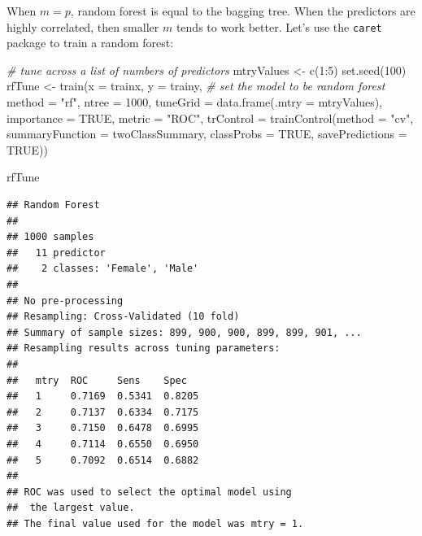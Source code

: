 \documentclass[
  12pt,
]{krantz}
\makeatletter
\newenvironment{Shaded}{\begin{snugshade}}{\end{snugshade}}
\newcommand{\AttributeTok}[1]{\textcolor[rgb]{0.61,0.61,0.61}{#1}}
\newcommand{\CommentTok}[1]{\textcolor[rgb]{0.37,0.37,0.37}{\textit{#1}}}
\newcommand{\ConstantTok}[1]{\textcolor[rgb]{0,0,0}{#1}}
\newcommand{\DecValTok}[1]{\textcolor[rgb]{0.06,0.06,0.06}{#1}}
\newcommand{\FunctionTok}[1]{\textcolor[rgb]{0,0,0}{#1}}
\newcommand{\NormalTok}[1]{#1}
\newcommand{\OtherTok}[1]{\textcolor[rgb]{0.37,0.37,0.37}{#1}}
\newcommand{\SpecialCharTok}[1]{\textcolor[rgb]{0,0,0}{#1}}
\newcommand{\StringTok}[1]{\textcolor[rgb]{0.5,0.5,0.5}{#1}}
\newenvironment{kframe}{%
\medskip{}
\setlength{\fboxsep}{.8em}
 \def\at@end@of@kframe{}%
 \ifinner\ifhmode%
  \def\at@end@of@kframe{\end{minipage}}%
  \begin{minipage}{\columnwidth}%
 \fi\fi%
 \def\FrameCommand##1{\hskip\@totalleftmargin \hskip-\fboxsep
 \colorbox{shadecolor}{##1}\hskip-\fboxsep
     \hskip-\linewidth \hskip-\@totalleftmargin \hskip\columnwidth}%
 \MakeFramed {\advance\hsize-\width
   \@totalleftmargin\z@ \linewidth\hsize
   \@setminipage}}%
 {\par\unskip\endMakeFramed%
 \at@end@of@kframe}
\renewenvironment{Shaded}{\begin{kframe}}{\end{kframe}}
\makeatother
\begin{document}
When \(m=p\), random forest is equal to the bagging tree. When the predictors are highly correlated, then smaller \(m\) tends to work better. Let's use the \texttt{caret} package to train a random forest:

\begin{Shaded}
\begin{Highlighting}[]
\CommentTok{\# tune across a list of numbers of predictors}
\NormalTok{mtryValues }\OtherTok{\textless{}{-}} \FunctionTok{c}\NormalTok{(}\DecValTok{1}\SpecialCharTok{:}\DecValTok{5}\NormalTok{)}
\FunctionTok{set.seed}\NormalTok{(}\DecValTok{100}\NormalTok{)}
\NormalTok{rfTune }\OtherTok{\textless{}{-}} \FunctionTok{train}\NormalTok{(}\AttributeTok{x =}\NormalTok{ trainx, }
               \AttributeTok{y =}\NormalTok{ trainy,}
               \CommentTok{\# set the model to be random forest}
               \AttributeTok{method =} \StringTok{"rf"}\NormalTok{,}
               \AttributeTok{ntree =} \DecValTok{1000}\NormalTok{,}
               \AttributeTok{tuneGrid =} \FunctionTok{data.frame}\NormalTok{(}\AttributeTok{.mtry =}\NormalTok{ mtryValues),}
               \AttributeTok{importance =} \ConstantTok{TRUE}\NormalTok{,}
               \AttributeTok{metric =} \StringTok{"ROC"}\NormalTok{,}
               \AttributeTok{trControl =} \FunctionTok{trainControl}\NormalTok{(}\AttributeTok{method =} \StringTok{"cv"}\NormalTok{,}
                           \AttributeTok{summaryFunction =}\NormalTok{ twoClassSummary,}
                           \AttributeTok{classProbs =} \ConstantTok{TRUE}\NormalTok{,}
                           \AttributeTok{savePredictions =} \ConstantTok{TRUE}\NormalTok{))}
\end{Highlighting}
\end{Shaded}

\begin{Shaded}
\begin{Highlighting}[]
\NormalTok{rfTune}
\end{Highlighting}
\end{Shaded}

\begin{verbatim}
## Random Forest 
## 
## 1000 samples
##   11 predictor
##    2 classes: 'Female', 'Male' 
## 
## No pre-processing
## Resampling: Cross-Validated (10 fold) 
## Summary of sample sizes: 899, 900, 900, 899, 899, 901, ... 
## Resampling results across tuning parameters:
## 
##   mtry  ROC     Sens    Spec  
##   1     0.7169  0.5341  0.8205
##   2     0.7137  0.6334  0.7175
##   3     0.7150  0.6478  0.6995
##   4     0.7114  0.6550  0.6950
##   5     0.7092  0.6514  0.6882
## 
## ROC was used to select the optimal model using
##  the largest value.
## The final value used for the model was mtry = 1.
\end{verbatim}
\end{document}
